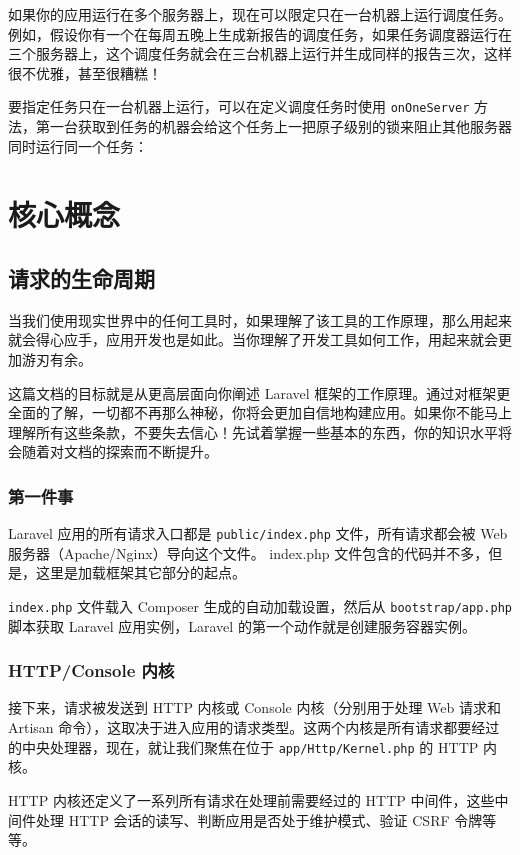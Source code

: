 \documentclass{progartcn}
\begin{document}
如果你的应用运行在多个服务器上，现在可以限定只在一台机器上运行调度任务。例如，假设你有一个在每周五晚上生成新报告的调度任务，如果任务调度器运行在三个服务器上，这个调度任务就会在三台机器上运行并生成同样的报告三次，这样很不优雅，甚至很糟糕！

要指定任务只在一台机器上运行，可以在定义调度任务时使用 \verb|onOneServer| 方法，第一台获取到任务的机器会给这个任务上一把原子级别的锁来阻止其他服务器同时运行同一个任务：


\section{核心概念}

\subsection{请求的生命周期}

当我们使用现实世界中的任何工具时，如果理解了该工具的工作原理，那么用起来就会得心应手，应用开发也是如此。当你理解了开发工具如何工作，用起来就会更加游刃有余。

这篇文档的目标就是从更高层面向你阐述 Laravel 框架的工作原理。通过对框架更全面的了解，一切都不再那么神秘，你将会更加自信地构建应用。如果你不能马上理解所有这些条款，不要失去信心！先试着掌握一些基本的东西，你的知识水平将会随着对文档的探索而不断提升。

\subsubsection{第一件事}

Laravel 应用的所有请求入口都是 \verb|public/index.php| 文件，所有请求都会被 Web 服务器（Apache/Nginx）导向这个文件。 index.php 文件包含的代码并不多，但是，这里是加载框架其它部分的起点。

\verb|index.php| 文件载入 Composer 生成的自动加载设置，然后从 \verb|bootstrap/app.php| 脚本获取 Laravel 应用实例，Laravel 的第一个动作就是创建服务容器实例。

\subsubsection{HTTP/Console 内核}

接下来，请求被发送到 HTTP 内核或 Console 内核（分别用于处理 Web 请求和 Artisan 命令），这取决于进入应用的请求类型。这两个内核是所有请求都要经过的中央处理器，现在，就让我们聚焦在位于 \verb|app/Http/Kernel.php| 的 HTTP 内核。

HTTP 内核还定义了一系列所有请求在处理前需要经过的 HTTP 中间件，这些中间件处理 HTTP 会话的读写、判断应用是否处于维护模式、验证 CSRF 令牌等等。
\end{document}
